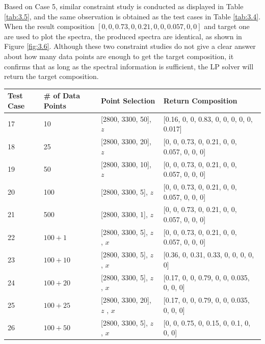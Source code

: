 Based on Case 5, similar constraint study is conducted as displayed in Table \ref{tab:3.5}, and the same observation is obtained as the test cases in Table \ref{tab:3.4}. When the result composition $[0, 0, 0.73, 0, 0.21,0, 0, 0.057, 0, 0]$ and target one are used to plot the spectra, the produced spectra are identical, as shown in Figure \ref{fig:3.6}. Although these two constraint studies do not give a clear answer about how many data points are enough to get the target composition, it confirms that as long as the spectral information is sufficient, the LP solver will return the target composition.
\begin{table}[ht!] \small 
\begin{center} 
{\def\arraystretch{1.5}
\begin{tabular}{| p{1cm} | p{2cm} | p{4cm}  | l |} 
\hline
Test Case & \# of Data Points & Point Selection & Return Composition \\ \hline
17 & 10 & [2800, 3300, 50], $z$ & [0.16, 0, 0, 0.83, 0, 0, 0, 0, 0, 0.017] \\ \hline
18 & 25 & [2800, 3300, 20], $z$ & [0, 0, 0.73, 0, 0.21, 0, 0, 0.057, 0, 0, 0] \\ \hline
19 & 50 & [2800, 3300, 10], $z$ & [0, 0, 0.73, 0, 0.21, 0, 0, 0.057, 0, 0, 0] \\ \hline
20 & 100 & [2800, 3300, 5], $z$ & [0, 0, 0.73, 0, 0.21, 0, 0, 0.057, 0, 0, 0] \\ \hline
21 & 500 & [2800, 3300, 1], $z$ & [0, 0, 0.73, 0, 0.21, 0, 0, 0.057, 0, 0, 0] \\ \hline	
22 & $100 + 1$ & [2800, 3300, 5], $z$ \newline [2800, 3300, 500], $x$  & [0, 0, 0.73, 0, 0.21, 0, 0, 0.057, 0, 0, 0] \\ \hline
23 & $100 + 10$ & [2800, 3300, 5], $z$ \newline [2800, 3300, 50], $x$  & [0.36, 0, 0.31, 0.33, 0, 0, 0, 0, 0] \\ \hline
24 & $100 + 20$ & [2800, 3300, 5], $z$ \newline [2800, 3300, 25], $x$  & [0.17, 0, 0, 0.79, 0, 0, 0.035, 0, 0, 0] \\ \hline
25 & $100 + 25$ & [2800, 3300, 20], $z$ \newline [2800, 3300, 20], $x$  & [0.17, 0, 0, 0.79, 0, 0, 0.035, 0, 0, 0] \\ \hline
26 & $100 + 50$ & [2800, 3300, 5], $z$ \newline [2800, 3300, 10], $x$  & [0, 0, 0.75, 0, 0.15, 0, 0.1, 0, 0, 0] \\ \hline

\end{tabular}}
\end{center}
\end{table}
